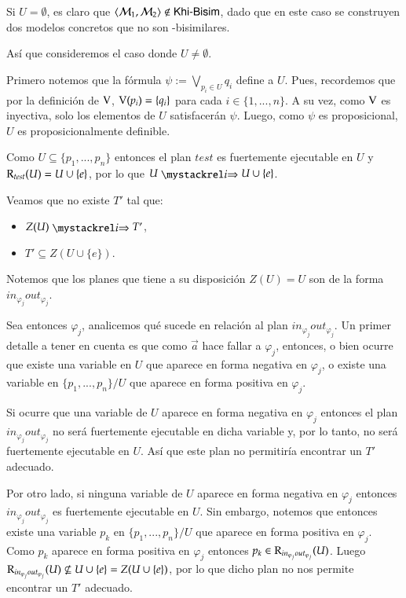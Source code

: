 \begin{demostracion}
\begin{itemize}
    Si $U = \emptyset$, es claro que $\langle \mathcal{M}_1,\mathcal{M}_2 \rangle \notin \rm\textsf{Khi-Bisim}$, dado que en este caso se construyen 
    dos modelos concretos que no son \KHilogic-bisimilares.

    Así que consideremos el caso donde $U \neq \emptyset$.
    
    Primero notemos que la fórmula $\psi := \bigvee\limits_{p_i \in U} q_i$ define a $U$. 
    Pues, recordemos que por la definición de $\mathrm{V}$, $\mathrm{V}(p_i) = \{q_i\}$ para cada $i \in \{1,...,n\}$. 
    A su vez, como $\mathrm{V}$ es inyectiva, solo los elementos de $U$ satisfacerán $\psi$. Luego, como $\psi$ es proposicional, 
    $U$ es proposicionalmente definible.

    Como $U \subseteq \{p_1,...,p_n\}$ entonces el plan $test$ es fuertemente ejecutable en $U$ y 
    $\mathrm{R}_{test}(U) = U \cup \{e\}$, por lo que $U \ultsExecAgi U \cup \{e\}$.
    
    Veamos que no existe $T'$ tal que:

    \begin{multicols}{2}
        \begin{itemize}
            \item $Z(U) \ultsExecAgi T'$, 
            \item $T' \subseteq Z(U \cup \{e\})$.
        \end{itemize}
    \end{multicols}

    Notemos que los planes que tiene a su disposición $Z(U) = U$ son de la forma $in_{\varphi_j}out_{\varphi_j}$.

    Sea entonces $\varphi_j$, analicemos qué sucede en relación al plan $in_{\varphi_j}out_{\varphi_j}$. 
    Un primer detalle a tener en cuenta es que como $\overrightarrow{a}$ hace fallar a $\varphi_j$, entonces, 
    o bien ocurre que existe una variable en $U$ que aparece en forma negativa en $\varphi_j$, 
    o existe una variable en $\{p_1,...,p_n\}/U$ que aparece en forma positiva en $\varphi_j$.

    Si ocurre que una variable de $U$ aparece en forma negativa en $\varphi_j$ entonces el plan 
    $in_{\varphi_j}out_{\varphi_j}$ no será fuertemente ejecutable en dicha variable y, por lo tanto, 
    no será fuertemente ejecutable en $U$. Así que este plan no permitiría encontrar un $T'$ adecuado.

    Por otro lado, si ninguna variable de $U$ aparece en forma negativa en $\varphi_j$ entonces 
    $in_{\varphi_j}out_{\varphi_j}$ es fuertemente ejecutable en $U$. Sin embargo, notemos que 
    entonces existe una variable $p_k$ en $\{p_1,...,p_n\}/U$ que aparece en forma positiva en $\varphi_j$. 
    Como $p_k$ aparece en forma positiva en $\varphi_j$ entonces $p_k \in \mathrm{R}_{in_{\varphi_j}out_{\varphi_j}}(U)$. 
    Luego $\mathrm{R}_{in_{\varphi_j}out_{\varphi_j}}(U) \not \subseteq U \cup \{e\} = Z(U \cup \{e\})$, por lo que dicho plan no nos 
    permite encontrar un $T'$ adecuado.
    

\end{itemize}
\end{demostracion}
